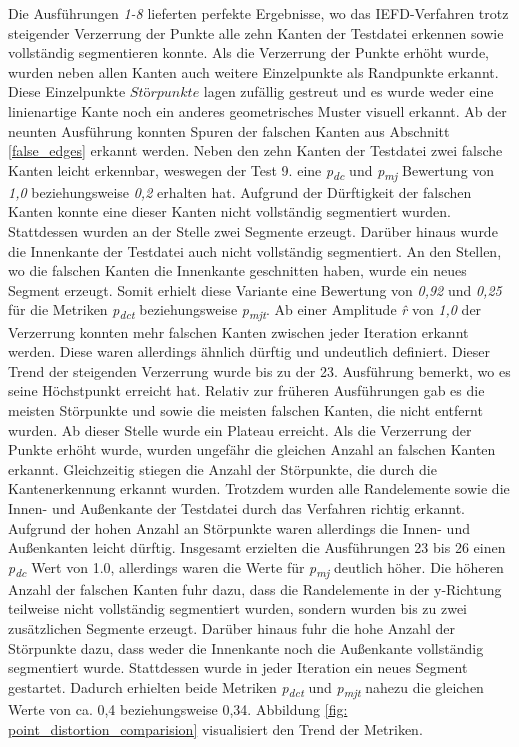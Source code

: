 Die Ausführungen \textit{1-8} lieferten perfekte Ergebnisse, wo das IEFD-Verfahren trotz steigender Verzerrung der Punkte alle zehn Kanten der Testdatei erkennen sowie vollständig segmentieren konnte. Als die Verzerrung der Punkte erhöht wurde, wurden neben allen Kanten auch weitere Einzelpunkte als Randpunkte erkannt. Diese Einzelpunkte \(Störpunkte\) lagen zufällig gestreut und es wurde weder eine linienartige Kante noch ein anderes geometrisches Muster visuell erkannt. Ab der neunten Ausführung konnten Spuren der falschen Kanten aus Abschnitt \ref{false_edges} erkannt werden. Neben den zehn Kanten der Testdatei zwei falsche Kanten leicht erkennbar, weswegen der Test 9. eine \textit{p\textsubscript{dc}} und \textit{p\textsubscript{mj}} Bewertung von \textit{1,0} beziehungsweise \textit{0,2} erhalten hat. Aufgrund der Dürftigkeit der falschen Kanten konnte eine dieser Kanten nicht vollständig segmentiert wurden. Stattdessen wurden an der Stelle zwei Segmente erzeugt. Darüber hinaus wurde die Innenkante der Testdatei auch nicht vollständig segmentiert. An den Stellen, wo die falschen Kanten die Innenkante geschnitten haben, wurde ein neues Segment erzeugt. Somit erhielt diese Variante eine Bewertung von \textit{0,92} und \textit{0,25} für die Metriken \textit{p\textsubscript{dct}} beziehungsweise \textit{p\textsubscript{mjt}}. Ab einer Amplitude \textit{\^{r}} von \textit{1,0} der Verzerrung konnten mehr falschen Kanten zwischen jeder Iteration erkannt werden. Diese waren allerdings ähnlich dürftig und undeutlich definiert.  Dieser Trend der steigenden Verzerrung wurde bis zu der 23. Ausführung bemerkt, wo es seine  Höchstpunkt erreicht hat. Relativ zur früheren Ausführungen gab es die meisten Störpunkte und sowie die meisten falschen Kanten, die nicht entfernt wurden. Ab dieser Stelle wurde ein Plateau erreicht. Als die Verzerrung der Punkte erhöht wurde, wurden ungefähr die gleichen Anzahl an falschen Kanten erkannt. Gleichzeitig stiegen die Anzahl der Störpunkte, die durch die Kantenerkennung erkannt wurden. Trotzdem wurden alle Randelemente sowie die Innen- und Außenkante der Testdatei durch das Verfahren richtig erkannt. Aufgrund der hohen Anzahl an Störpunkte waren allerdings die Innen- und Außenkanten leicht dürftig. Insgesamt erzielten die Ausführungen 23 bis 26 einen \textit{p\textsubscript{dc}} Wert von 1.0, allerdings waren die Werte für \textit{p\textsubscript{mj}} deutlich höher. Die höheren Anzahl der falschen Kanten fuhr dazu, dass die Randelemente in der y-Richtung teilweise nicht vollständig segmentiert wurden, sondern wurden bis zu zwei zusätzlichen Segmente erzeugt. Darüber hinaus fuhr die hohe Anzahl der Störpunkte dazu, dass weder die Innenkante noch die Außenkante vollständig segmentiert wurde. Stattdessen wurde in jeder Iteration ein neues Segment gestartet. Dadurch erhielten beide Metriken \textit{p\textsubscript{dct}} und \textit{p\textsubscript{mjt}} nahezu die gleichen Werte von ca. 0,4 beziehungsweise 0,34. Abbildung \ref{fig: point_distortion_comparision} visualisiert den Trend der Metriken.

